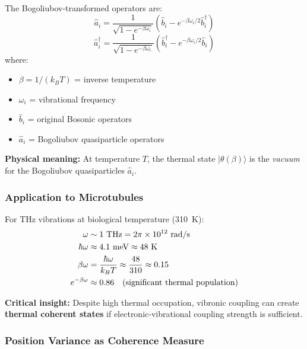 The Bogoliubov-transformed operators are:
\begin{equation}
\hat{a}_i = \frac{1}{\sqrt{1 - e^{-\beta \omega_i}}} \left( \hat{b}_i - e^{-\beta \omega_i/2} \hat{b}_i^\dagger \right)
\label{eq:bogoliubov-a}
\end{equation}
\begin{equation}
\hat{a}_i^\dagger = \frac{1}{\sqrt{1 - e^{-\beta \omega_i}}} \left( \hat{b}_i^\dagger - e^{-\beta \omega_i/2} \hat{b}_i \right)
\label{eq:bogoliubov-adagger}
\end{equation}
where:
\begin{itemize}
\item $\beta = 1/(k_B T)$ = inverse temperature
\item $\omega_i$ = vibrational frequency
\item $\hat{b}_i$ = original Bosonic operators
\item $\hat{a}_i$ = Bogoliubov quasiparticle operators
\end{itemize}

\textbf{Physical meaning:} At temperature $T$, the thermal state $|\theta(\beta)\rangle$ is the \emph{vacuum} for the Bogoliubov quasiparticles $\hat{a}_i$.

\subsubsection{Application to Microtubules}

For THz vibrations at biological temperature (310~K):
\begin{align}
\omega &\sim 1 \text{ THz} = 2\pi \times 10^{12} \text{ rad/s} \notag \\
\hbar\omega &\approx 4.1 \text{ meV} \approx 48 \text{ K} \label{eq:thz-energy} \\
\beta\omega &= \frac{\hbar\omega}{k_B T} \approx \frac{48}{310} \approx 0.15 \label{eq:beta-omega} \\
e^{-\beta\omega} &\approx 0.86 \quad \text{(significant thermal population)} \label{eq:thermal-factor}
\end{align}

\textbf{Critical insight:} Despite high thermal occupation, vibronic coupling can create \textbf{thermal coherent states} if electronic-vibrational coupling strength is sufficient.

\subsubsection{Position Variance as Coherence Measure}

